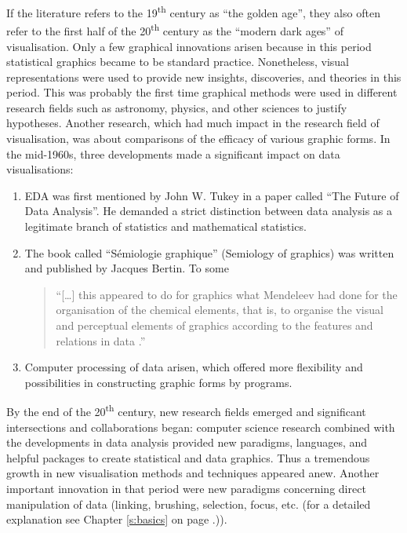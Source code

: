 If the literature refers to the 19\textsuperscript{th} century as ``the golden age'', they also often refer to the first half of the 20\textsuperscript{th} century as the ``modern dark ages'' of visualisation. Only a few graphical innovations arisen because in this period statistical graphics became to be standard practice. Nonetheless, visual representations were used to provide new insights, discoveries, and theories in this period. This was probably the first time graphical methods were used in different research fields such as astronomy, physics, and other sciences to justify hypotheses. Another research, which had much impact in the research field of visualisation, was about comparisons of the efficacy of various graphic forms. In the mid-1960s, three developments made a significant impact on data visualisations:

\begin{enumerate}
\item \ac{EDA} was first mentioned by John W. Tukey in a paper called ``The Future of Data Analysis''. He demanded a strict distinction between data analysis as a legitimate branch of statistics and mathematical statistics.
\item The book called ``Sémiologie graphique'' (Semiology of graphics) was written and published by Jacques Bertin. To some
\begin{quote}
``[\ldots] this appeared to do for graphics what Mendeleev had done for the organisation of the chemical elements, that is, to organise the visual and perceptual elements of graphics according to the features and relations in data .''
\end{quote}
\label{crossref:bertain}
\item Computer processing of data arisen, which offered more flexibility and possibilities in constructing graphic forms by programs.
\end{enumerate}

By the end of the 20\textsuperscript{th} century, new research fields emerged and significant intersections and collaborations began: computer science research combined with the developments in data analysis provided new paradigms, languages, and helpful packages to create statistical and data graphics. Thus a tremendous growth in new visualisation methods and techniques appeared anew.
Another important innovation in that period were new paradigms  concerning direct manipulation of data (linking, brushing, selection, focus, etc. (for a detailed explanation see Chapter \ref{s:basics} on page \pageref{s:basics}.)).
